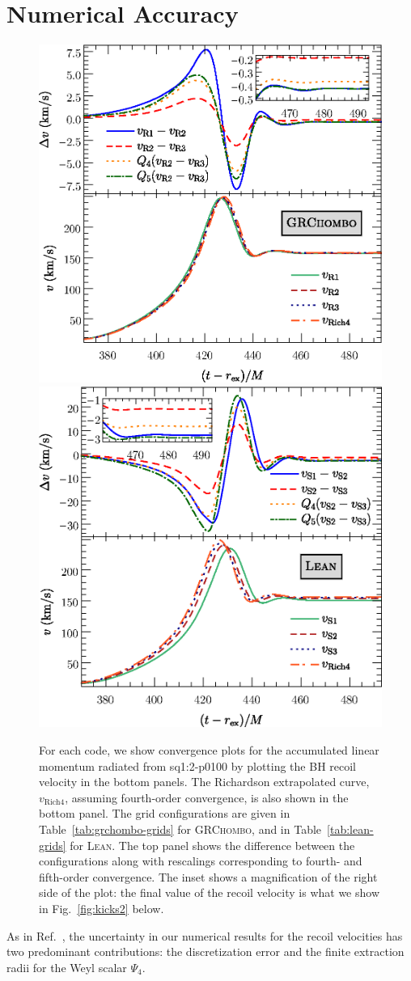 \documentclass[floats,floatfix,showpacs,amssymb,prd,twocolumn,superscriptaddress,nofootinbib,nolongbibliography,reprint]{revtex4-2}
\begin{document}
\section{Numerical Accuracy}
\label{sec:accuracy}
\begin{figure}[t]
    \subfloat%
    {
        \includegraphics[width=0.48\linewidth]{grchombo-convergence5.eps}
    }
    \hfill
    \subfloat%
    {
        \includegraphics[width=0.48\linewidth]{lean-convergence4.eps}
    }
    \caption{For each code, we show convergence plots for the
      accumulated linear momentum radiated from \textsf{sq1:2-p0100}
      by plotting the BH recoil velocity in the bottom panels. The
      Richardson extrapolated curve, $v_{\mathrm{Rich4}}$, assuming
      fourth-order convergence, is also shown in the bottom panel. The
      grid configurations are given in Table~\ref{tab:grchombo-grids}
      for \textsc{GRChombo}, and in Table~\ref{tab:lean-grids} for
      \textsc{Lean}. The top panel shows the difference between the
      configurations along with rescalings corresponding to fourth- and
      fifth-order convergence. The inset shows a magnification of the
      right side of the plot: the final value of the recoil
      velocity is what we show in Fig.~\ref{fig:kicks2} below.} 
    \label{fig:convergence}
\end{figure}
As in Ref.~\cite{Sperhake:2019wwo}, the uncertainty in our numerical results 
for the recoil velocities has two predominant contributions: the 
discretization error and the finite extraction radii for the Weyl scalar
$\Psi_4$.
\end{document}
